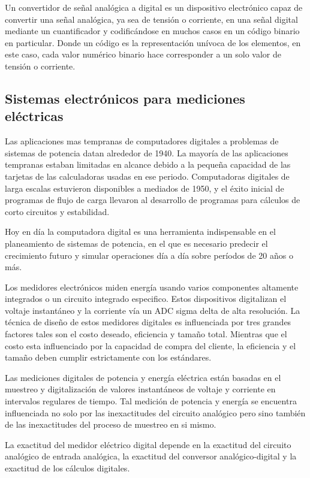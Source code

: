 Un convertidor de señal analógica a digital es un dispositivo electrónico capaz de convertir una señal analógica, ya sea de tensión o corriente, en una señal digital mediante un cuantificador y codificándose en muchos casos en un código binario en particular. Donde un código es la representación unívoca de los elementos, en este caso, cada valor numérico binario hace corresponder a un solo valor de tensión o corriente.\citep{ADCcitation}


\subsection{Sistemas electrónicos para mediciones eléctricas}

Las aplicaciones mas tempranas de computadores digitales a problemas de sistemas de potencia datan alrededor de 1940. La mayoría de las aplicaciones tempranas estaban limitadas en alcance debido a la pequeña capacidad de las tarjetas de las calculadoras usadas en ese periodo. Computadoras digitales de larga escalas estuvieron disponibles a mediados de 1950, y el éxito inicial de programas de flujo de carga llevaron al desarrollo de programas para cálculos de corto circuitos y estabilidad.\citep{761852}

Hoy en día la computadora digital es una herramienta indispensable en el planeamiento de sistemas de potencia, en el que es necesario predecir el crecimiento futuro y simular operaciones día  a día sobre períodos de 20 años o más.\citep{761852}

Los medidores electrónicos miden energía usando varios componentes altamente integrados o un circuito integrado especifico. Estos dispositivos digitalizan el voltaje instantáneo y la corriente vía un ADC sigma delta  de alta resolución. La técnica de diseño de estos medidores digitales es influenciada por tres grandes factores tales son el costo deseado, eficiencia y tamaño total. Mientras que el costo esta influenciado por la capacidad de compra del cliente, la eficiencia y el tamaño deben cumplir estrictamente con los estándares.\citep{articleDM}

Las mediciones digitales de potencia y energía eléctrica están basadas en el muestreo y digitalización de valores instantáneos de voltaje y corriente en intervalos regulares de tiempo. Tal medición de potencia y energía se encuentra influenciada no solo por las inexactitudes del circuito analógico pero sino también de las inexactitudes del proceso de muestreo en si mismo.

La exactitud del medidor eléctrico digital depende en la exactitud del circuito analógico de entrada analógica, la exactitud del conversor analógico-digital y la exactitud de los cálculos digitales.\citep{Hribik2004DigitalPA}


